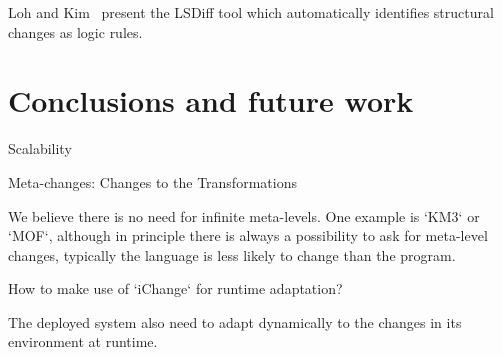 \documentclass[10pt, conference, compsocconf]{IEEEtran}
\begin{document}
Loh and Kim~\cite{Loh:2010:LPD:1810295.1810348,Kim:2009:DRS:1555001.1555046} present the LSDiff tool which automatically identifies structural changes as logic rules.




\section{Conclusions and future work}

   Scalability
   
   Meta-changes: Changes to the Transformations
   
   We believe there is no need for infinite meta-levels. One example is `KM3` or `MOF`, although in principle there is always a possibility to ask for meta-level 
   changes, typically the language is less likely to change than the program.
   
   How to make use of `iChange` for runtime adaptation?
   
   The deployed system also need to adapt dynamically to the changes in its environment at runtime.
\cite{klint05tosem}  
\cite{cordy02} 
\cite{txl} 
\cite{wenzel08icse} 
\cite{xing05ase} 
\cite{fluri07tse}
\cite{schmidt08icse} 
\cite{wenzel08icsm}
\cite{brunet06gamma}
\cite{degenais08icse}
\cite{canfora09software}
%
\begin{small}
\balance


\end{small}
\end{document}
